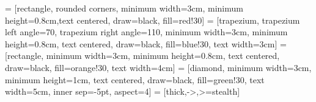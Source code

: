 {
}

\newcommand{\ifalignrcode}{\hspace{2pt}}
\newcommand{\iftab}{\phantom{x}\hspace{3ex}}
\newcommand{\ifunknown}[1]{\textcolor{blue}{#1}}
\newcommand{\ifaborted}[1]{\textcolor{gray}{#1}}
\newcommand{\ifpassed}[1]{\textcolor{green}{#1}}
\newcommand{\iffailed}[1]{\textcolor{red}{#1}}
\newcommand{\ifnotice}[1]{\textbf{\textcolor{red}{#1}}}
\usepackage{multirow}

\usetikzlibrary{shapes.geometric, arrows}
 = [rectangle, rounded corners, minimum width=3cm, minimum height=0.8cm,text centered, draw=black, fill=red!30]
 = [trapezium, trapezium left angle=70, trapezium right angle=110, minimum width=3cm, minimum height=0.8cm, text centered, draw=black, fill=blue!30, text width=3cm]
 = [rectangle, minimum width=3cm, minimum height=0.8cm, text centered, draw=black, fill=orange!30, text width=4cm]
 = [diamond, minimum width=3cm, minimum height=1cm, text centered, draw=black, fill=green!30, text width=5cm, inner sep=-5pt, aspect=4]
 = [thick,->,>=stealth]
